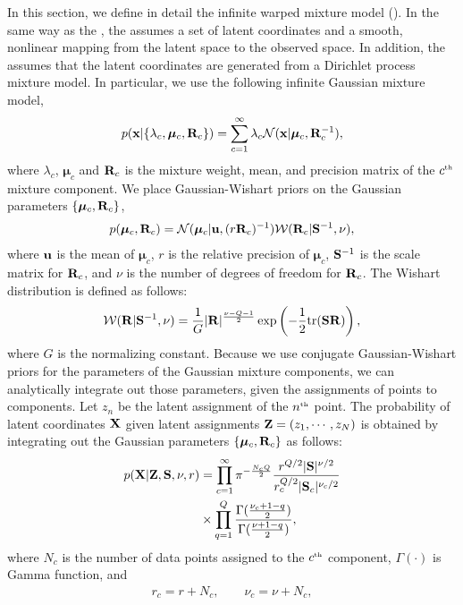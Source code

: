 In this section, we define in detail the infinite warped mixture model (\iwmm{}).
In the same way as the \gplvm{}, the \iwmm{} assumes a set of latent coordinates and a smooth, nonlinear mapping from the latent space to the observed space.
In addition, the \iwmm{} assumes that the latent coordinates
are generated from a Dirichlet process mixture model.
In particular, we use the following infinite Gaussian mixture model,
\begin{align}
p({\bf{x}}|\{\lambda_{c},\bm{\mu}_{c},\mathbf{R}_{c}\}) = \sum_{c=1}^{\infty} \lambda_{c} {\cal N}({\bf{x}}|\bm{\mu}_{c},\mathbf{R}_{c}^{-1}),
\end{align}
where $\lambda_{c}$, $\bm{\mu}_{c}$ and $\mathbf{R}_{c}$ is the mixture weight, 
mean, and precision matrix of the $c^{\text{\tiny th}}$ mixture component.
We place Gaussian-Wishart priors on the Gaussian parameters
$\{\bm{\mu}_{c},\mathbf{R}_{c}\}$,
\begin{align}
p(\bm{\mu}_{c},\mathbf{R}_{c})
= {\cal N}(\bm{\mu}_{c}|{\bf{u}},(r\mathbf{R}_{c})^{-1})
{\cal W}(\mathbf{R}_{c}|\mathbf{S}^{-1},\nu),
\end{align}
where ${\bf{u}}$ is the mean of $\bm{\mu}_{c}$, 
$r$ is the relative precision of $\bm{\mu}_{c}$, 
$\mathbf{S}^{-1}$ is the scale matrix for $\mathbf{R}_{c}$, 
and $\nu$ is the number of degrees of freedom for $\mathbf{R}_{c}$.
The Wishart distribution is defined as follows:
\begin{align}
{\cal W}(\mathbf{R}|\mathbf{S}^{-1},\nu)
=\frac{1}{G}|\mathbf{R}|^{\frac{\nu-Q-1}{2}}\exp\left(-\frac{1}{2}{\rm tr}(\mathbf{S}\mathbf{R})\right),
\end{align}
where $G$ is the normalizing constant.
Because we use conjugate Gaussian-Wishart priors 
for the parameters of the Gaussian mixture components, we can analytically integrate out those parameters, given the assignments of points to components.
Let $z_{n}$ be the latent assignment of the $n^{\text{\tiny th}}$ point.
The probability of latent coordinates $\mathbf{X}$
given latent assignments $\mathbf{Z}=(z_{1},\cdots,z_{N})$ is obtained 
by integrating out the Gaussian parameters $\{\bm{\mu}_{c},\mathbf{R}_{c}\}$
as follows:
\begin{align}
p(\mathbf{X}|\mathbf{Z},\mathbf{S},\nu,r) &= \prod_{c=1}^{\infty}
\pi^{-\frac{N_{c}Q}{2}}\frac{r^{Q/2}|\mathbf{S}|^{\nu/2}}{r_{c}^{Q/2}|\mathbf{S}_{c}|^{\nu_{c}/2}}
\nonumber\\
&\times \prod_{q=1}^{Q}\frac{\Gamma(\frac{\nu_{c}+1-q}{2})}{\Gamma(\frac{\nu+1-q}{2})},
\label{eq:px_z}
\end{align}
where
$N_{c}$ is the number of data points assigned to the $c^{\text{\tiny th}}$ component,
$\Gamma(\cdot)$ is Gamma function,
and
\begin{align}
r_{c}=r+N_{c}, \hspace{2em}
\nu_{c}=\nu+N_{c}, 
\nonumber
\end{align}
